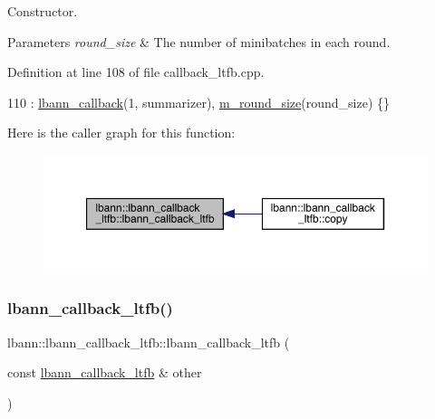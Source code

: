 Constructor. 
\begin{DoxyParams}{Parameters}
{\em round\+\_\+size} & The number of minibatches in each round. \\
\hline
\end{DoxyParams}


Definition at line 108 of file callback\+\_\+ltfb.\+cpp.


\begin{DoxyCode}
110   : \hyperlink{classlbann_1_1lbann__callback_a679057298a41ddd47f08c157f756c584}{lbann\_callback}(1, summarizer), \hyperlink{classlbann_1_1lbann__callback__ltfb_a78434b8e8b1dfa43a68a9707473cf789}{m\_round\_size}(round\_size) \{\}
\end{DoxyCode}
Here is the caller graph for this function\+:\nopagebreak
\begin{figure}[H]
\begin{center}
\leavevmode
\includegraphics[width=350pt]{classlbann_1_1lbann__callback__ltfb_a44cb8fdfa7aae5d35543e47f3105f8cb_icgraph}
\end{center}
\end{figure}
\mbox{\label{classlbann_1_1lbann__callback__ltfb_af589490a67c5490ac91210c89ab66295}} 
\subsubsection{\texorpdfstring{lbann\+\_\+callback\+\_\+ltfb()}{lbann\_callback\_ltfb()}\hspace{0.1cm}{\footnotesize\ttfamily [2/2]}}
{\footnotesize\ttfamily lbann\+::lbann\+\_\+callback\+\_\+ltfb\+::lbann\+\_\+callback\+\_\+ltfb (\begin{DoxyParamCaption}\item[{const \hyperlink{classlbann_1_1lbann__callback__ltfb}{lbann\+\_\+callback\+\_\+ltfb} \&}]{other }\end{DoxyParamCaption})}



